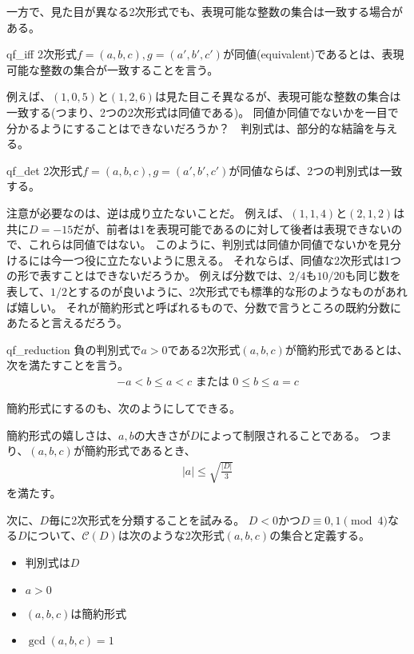 一方で、見た目が異なる2次形式でも、表現可能な整数の集合は一致する場合がある。

\begin{Defi}{}{qf_iff}
2次形式$f=(a,b,c),g=(a',b',c')$が同値(equivalent)であるとは、表現可能な整数の集合が一致することを言う。
\end{Defi}

例えば、$(1,0,5)$と$(1,2,6)$は見た目こそ異なるが、表現可能な整数の集合は一致する(つまり、2つの2次形式は同値である)。
同値か同値でないかを一目で分かるようにすることはできないだろうか？　判別式は、部分的な結論を与える。

\begin{Prop}{}{qf_det}
2次形式$f=(a,b,c),g=(a',b',c')$が同値ならば、2つの判別式は一致する。
\end{Prop}

注意が必要なのは、逆は成り立たないことだ。
例えば、$(1,1,4)$と$(2,1,2)$は共に$D=-15$だが、前者は1を表現可能であるのに対して後者は表現できないので、これらは同値ではない。
このように、判別式は同値か同値でないかを見分けるには今一つ役に立たないように思える。
それならば、同値な2次形式は1つの形で表すことはできないだろうか。
例えば分数では、$2/4$も$10/20$も同じ数を表して、$1/2$とするのが良いように、2次形式でも標準的な形のようなものがあれば嬉しい。
それが簡約形式と呼ばれるもので、分数で言うところの既約分数にあたると言えるだろう。

\begin{Defi}{}{qf_reduction}
負の判別式で$a>0$である2次形式$(a,b,c)$が簡約形式であるとは、次を満たすことを言う。
\begin{align*}
-a < b \le a < c \mbox{ または } 0 \le b \le a = c
\end{align*}
\end{Defi}

簡約形式にするのも、次のようにしてできる。


簡約形式の嬉しさは、$a,b$の大きさが$D$によって制限されることである。
つまり、$(a,b,c)$が簡約形式であるとき、
\begin{align*}
|a| \le \sqrt{\frac{|D|}{3}}
\end{align*}
を満たす。

次に、$D$毎に2次形式を分類することを試みる。
$D<0$かつ$D\equiv0,1\pmod{4}$なる$D$について、$\mathcal{C}(D)$は次のような2次形式$(a,b,c)$の集合と定義する。
\begin{itemize}
 \item 判別式は$D$
 \item $a>0$
 \item $(a,b,c)$は簡約形式
 \item $\gcd(a,b,c)=1$
\end{itemize}

